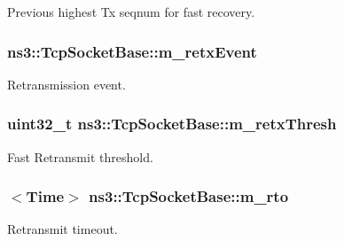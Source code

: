 Previous highest Tx seqnum for fast recovery. 

\subsubsection[{\texorpdfstring{m\+\_\+retx\+Event}{m_retxEvent}}]{ ns3\+::\+Tcp\+Socket\+Base\+::m\+\_\+retx\+Event\hspace{0.3cm}{\ttfamily [protected]}}\hypertarget{classns3_1_1TcpSocketBase_a620dd547e6484bc03c6b796f589b75a6}{}\label{classns3_1_1TcpSocketBase_a620dd547e6484bc03c6b796f589b75a6}


Retransmission event. 

\subsubsection[{\texorpdfstring{m\+\_\+retx\+Thresh}{m_retxThresh}}]{\setlength{\rightskip}{0pt plus 5cm}uint32\+\_\+t ns3\+::\+Tcp\+Socket\+Base\+::m\+\_\+retx\+Thresh\hspace{0.3cm}{\ttfamily [protected]}}\hypertarget{classns3_1_1TcpSocketBase_aea5678454b966c263c6f72f174e6e328}{}\label{classns3_1_1TcpSocketBase_aea5678454b966c263c6f72f174e6e328}


Fast Retransmit threshold. 

\subsubsection[{\texorpdfstring{m\+\_\+rto}{m_rto}}]{$<${\bf Time}$>$ ns3\+::\+Tcp\+Socket\+Base\+::m\+\_\+rto\hspace{0.3cm}{\ttfamily [protected]}}\hypertarget{classns3_1_1TcpSocketBase_a47788384a59ae230896377ceab6829d4}{}\label{classns3_1_1TcpSocketBase_a47788384a59ae230896377ceab6829d4}


Retransmit timeout. 


